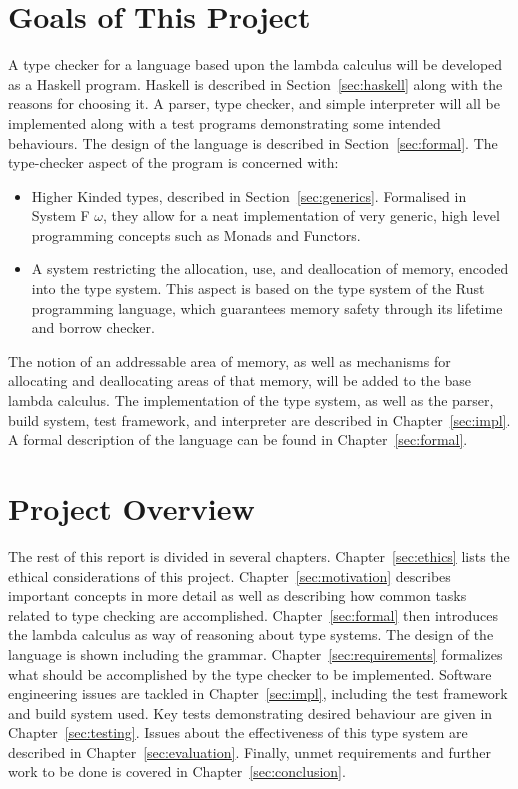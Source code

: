 \section{Goals of This Project}
A type checker for a language based upon the lambda calculus will be developed
as a Haskell program. Haskell is described in Section~\ref{sec:haskell} along
with the reasons for choosing it. A parser, type checker, and simple
interpreter will all be implemented along with a test programs demonstrating
some intended behaviours. The design of the language is described in
Section~\ref{sec:formal}.  The type-checker aspect of the program is concerned
with:
\begin{itemize}
    \item Higher Kinded types, described in Section~\ref{sec:generics}.
        Formalised in System F $\omega$, they allow for a neat implementation of
        very generic, high level programming concepts such as Monads and
        Functors.
    \item A system restricting the allocation, use, and deallocation of memory,
        encoded into the type system. This aspect is based on the type system
        of the Rust programming language, which guarantees memory safety through
        its lifetime and borrow checker.
\end{itemize}
The notion of an addressable area of memory, as well as mechanisms for
allocating and deallocating areas of that memory, will be added to the base
lambda calculus.  The implementation of the type system, as well as the parser,
build system, test framework, and interpreter are described in
Chapter~\ref{sec:impl}. A formal description of the language can be found in
Chapter~\ref{sec:formal}.


\section{Project Overview}
The rest of this report is divided in several chapters. Chapter~\ref{sec:ethics}
lists the ethical considerations of this project. Chapter~\ref{sec:motivation}
describes important concepts in more detail as well as describing how common tasks
related to type checking are accomplished. Chapter~\ref{sec:formal} then introduces the
lambda calculus as way of reasoning about type systems. The design of the language
is shown including the grammar. Chapter~\ref{sec:requirements} formalizes what
should be accomplished by the type checker to be implemented. Software engineering
issues are tackled in Chapter~\ref{sec:impl}, including the test framework and
build system used. Key tests demonstrating desired behaviour are given in
Chapter~\ref{sec:testing}. Issues about the effectiveness of this type system
are described in Chapter~\ref{sec:evaluation}. Finally, unmet requirements and
further work to be done is covered in Chapter~\ref{sec:conclusion}.
